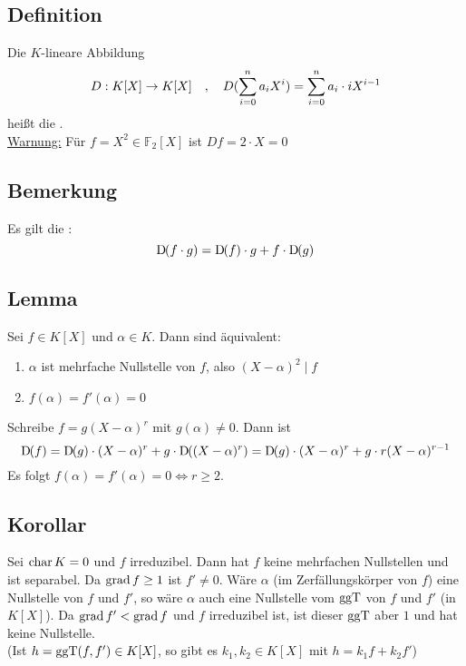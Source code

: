 \subsection[Definition: Formale Ableitung]{Definition} %
\label{sub:163}
Die $K$-lineare Abbildung 
\[
	D : K[X] \to K[X] \quad , \quad D (\sum_{i=0}^{n} a_i X^i) = \sum_{i=0}^{n} a_i \cdot i X^{i-1} 
\]
heißt die .\\
\uline{Warnung:} Für $f=X^2 \in \mathds{F}_2[X]$ ist $D f = 2 \cdot X =0$

\subsection[Bemerkung: Leibnizregel]{Bemerkung} %
\label{sub:164}
Es gilt die :
\[
	\mathrm{D}\mkern-1.5mu(f \cdot g) = \mathrm{D}\mkern-1.5mu (f)\cdot  g + f \cdot \mathrm{D}\mkern-1.5mu(g)
\]

\subsection[Lemma: Vielfachheit von Nullstellen bestimmen mittels der formalen Ableitung]{Lemma} %
\label{sub:165}
Sei $f \in K[X]$ und $\alpha \in K$. Dann sind äquivalent:
\begin{enumerate}[(1)]
	\item $\alpha$ ist mehrfache Nullstelle von $f$, also $(X-\alpha)^2 \mid f$
	\item $f(\alpha) = f'(\alpha)=0$
\end{enumerate}
Schreibe $f=g(X-\alpha)^r$ mit $g(\alpha)\not= 0$. Dann ist 
\[
	\mathrm{D}\mkern-1.5mu (f) = \mathrm{D}\mkern-1.5mu (g) \cdot (X-\alpha)^r + g \cdot \mathrm{D}\mkern-1.5mu((X-\alpha)^r) = \mathrm{D}\mkern-1.5mu (g) \cdot  (X-\alpha)^r + g \cdot r(X-\alpha)^{r-1}
\]
Es folgt $f(\alpha)= f'(\alpha)=0 \iff r\ge 2$. \bewende

\subsection[Korollar: Irreduzible Polynome sind separabel, wenn $\Char K=0$]{Korollar} %
\label{sub:166}
Sei $\Char K =0$ und $f$ irreduzibel. Dann hat $f$ keine mehrfachen Nullstellen und ist separabel.
Da $\operatorname{grad} f \ge 1$ ist $f' \not=0$. Wäre $\alpha$ (im Zerfällungskörper von $f$) eine Nullstelle von $f$ und $f'$, so wäre $\alpha$ auch eine Nullstelle vom $\operatorname{ggT}$ von
$f$ und $f'$ (in $K[X]$). Da $\operatorname{grad} f' < \operatorname{grad} f$ und $f$ irreduzibel ist, ist dieser $\operatorname{ggT}$ aber $1$ und hat keine Nullstelle. \bewende\\
(Ist $h= \operatorname{ggT} (f,f') \in K[X]$, so gibt es $k_1, k_2 \in K[X]$ mit $h=k_1 f+ k_2 f'$)

